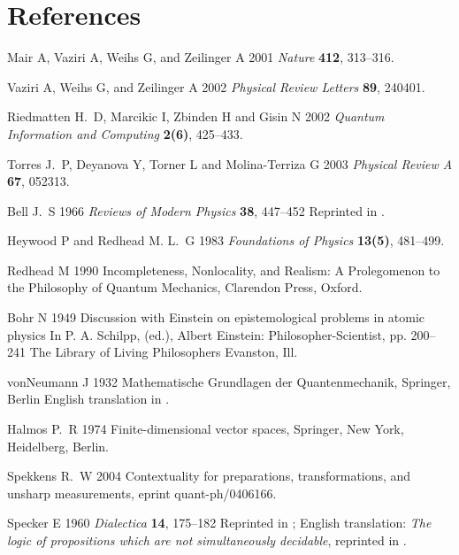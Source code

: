 \documentclass[12pt]{iopart}
\begin{document}
%
%
%
%
%
%
%
\section*{References}

\begin{thebibliography}{10}

Mair A, Vaziri A, Weihs G,   and Zeilinger A 2001
{\em Nature} {\bf 412}, 313--316.

Vaziri A, Weihs G,   and Zeilinger A 2002
{\em Physical Review Letters} {\bf 89}, 240401.

Riedmatten H.~D, Marcikic I, Zbinden H  and Gisin N 2002
{\em Quantum Information and Computing} {\bf 2(6)}, 425--433.

Torres J.~P, Deyanova Y, Torner L  and Molina-Terriza G 2003
{\em Physical Review A} {\bf 67}, 052313.

Bell J.~S 1966
{\em Reviews of Modern Physics} {\bf 38}, 447--452
Reprinted in \cite[pp. 1-13]{bell-87}.

Heywood P and Redhead M. L.~G 1983
{\em Foundations of Physics} {\bf 13(5)}, 481--499.

Redhead M 1990
Incompleteness, Nonlocality, and Realism: A Prolegomenon to the Philosophy of
  Quantum Mechanics,
Clarendon Press, Oxford.

Bohr N 1949
Discussion with {E}instein on epistemological problems in atomic physics
In P. A. Schilpp, (ed.), {A}lbert {E}instein: Philosopher-Scientist,  pp.
  200--241 The Library of Living Philosophers Evanston, Ill.

vonNeumann J 1932
Mathematische Grundlagen der Quantenmechanik,
Springer, Berlin
{E}nglish translation in \cite{v-neumann-55}.

Halmos P.~R 1974
Finite-dimensional vector spaces,
Springer, New York, Heidelberg, Berlin.

Spekkens R.~W 2004
Contextuality for preparations, transformations, and unsharp measurements,
eprint quant-ph/0406166.

Specker E 1960
{\em Dialectica} {\bf 14}, 175--182
Reprinted in \cite[pp. 175--182]{specker-ges}; {E}nglish translation: {\it The
  logic of propositions which are not simultaneously decidable}, reprinted in
  \cite[pp. 135-140]{hooker}.


\end{thebibliography}
\end{document}
